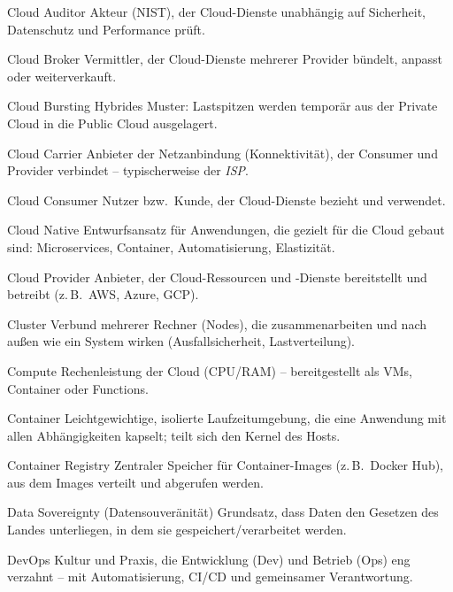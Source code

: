 \begin{glossar}
  \item[Cloud Auditor] Akteur (NIST), der Cloud-Dienste unabhängig auf Sicherheit,
        Datenschutz und Performance prüft.

  \item[Cloud Broker] Vermittler, der Cloud-Dienste mehrerer Provider bündelt,
        anpasst oder weiterverkauft.

  \item[Cloud Bursting] Hybrides Muster: Lastspitzen werden temporär aus der
        Private Cloud in die Public Cloud ausgelagert.

  \item[Cloud Carrier] Anbieter der Netzanbindung (Konnektivität), der Consumer
        und Provider verbindet -- typischerweise der \emph{ISP}.

  \item[Cloud Consumer] Nutzer bzw.\ Kunde, der Cloud-Dienste bezieht und verwendet.

  \item[Cloud Native] Entwurfsansatz für Anwendungen, die gezielt für die Cloud
        gebaut sind: Microservices, Container, Automatisierung, Elastizität.

  \item[Cloud Provider] Anbieter, der Cloud-Ressourcen und -Dienste bereitstellt
        und betreibt (z.\,B.\ AWS, Azure, GCP).

  \item[Cluster] Verbund mehrerer Rechner (Nodes), die zusammenarbeiten und
        nach außen wie ein System wirken (Ausfallsicherheit, Lastverteilung).

  \item[Compute] Rechenleistung der Cloud (CPU/RAM) -- bereitgestellt als VMs,
        Container oder Functions.

  \item[Container] Leichtgewichtige, isolierte Laufzeitumgebung, die eine
        Anwendung mit allen Abhängigkeiten kapselt; teilt sich den Kernel des Hosts.

  \item[Container Registry] Zentraler Speicher für Container-Images (z.\,B.\
        Docker Hub), aus dem Images verteilt und abgerufen werden.

  \item[Data Sovereignty (Datensouveränität)] Grundsatz, dass Daten den Gesetzen
        des Landes unterliegen, in dem sie gespeichert/verarbeitet werden.

  \item[DevOps] Kultur und Praxis, die Entwicklung (Dev) und Betrieb (Ops) eng
        verzahnt -- mit Automatisierung, CI/CD und gemeinsamer Verantwortung.


\end{glossar}
